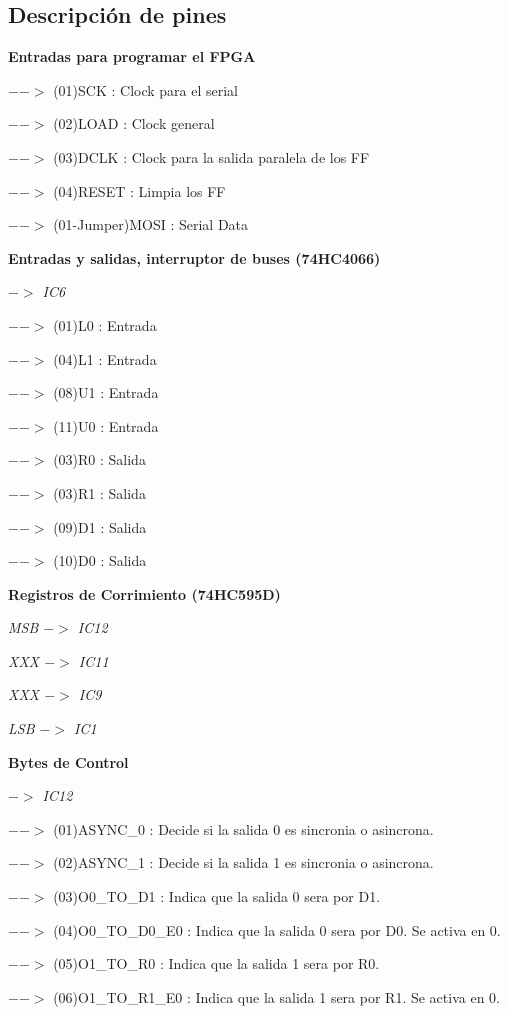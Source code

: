 \documentclass[12pt]{article}
\begin{document}
\pagebreak

\subsection{Descripción de pines}

\textbf{Entradas para programar el FPGA}

	$-->$	(01)SCK	:	Clock para el serial
	
	$-->$	(02)LOAD	:	Clock general
	
	$-->$	(03)DCLK	:	Clock para la salida paralela de los FF
	
	$-->$	(04)RESET	:	Limpia los FF
	
	$-->$	(01-Jumper)MOSI	:	Serial Data
	
\textbf{Entradas y salidas, interruptor de buses (74HC4066)}

\textit{$->$	IC6}

	$-->$	(01)L0	:	Entrada
	
	$-->$	(04)L1	:	Entrada
	
	$-->$	(08)U1	:	Entrada
	
	$-->$	(11)U0	:	Entrada
	
	$-->$	(03)R0	:	Salida
	
	$-->$	(03)R1	:	Salida
	
	$-->$	(09)D1	:	Salida
	
	$-->$	(10)D0	:	Salida
	
\textbf{Registros de Corrimiento	(74HC595D)}

\textit{MSB	$->$	IC12}

\textit{XXX	$->$	IC11}
	
\textit{XXX	$->$	IC9}
	
\textit{LSB	$->$	IC1}

\textbf{Bytes de Control}

\textit{$->$	IC12}

	$-->$	(01)ASYNC\_0	:	Decide si la salida 0 es sincronia o asincrona.
	
	$-->$	(02)ASYNC\_1	:	Decide si la salida 1 es sincronia o asincrona.
	
	$-->$	(03)O0\_TO\_D1	:	Indica que la salida 0 sera por D1.
	
	$-->$	(04)O0\_TO\_D0\_E0	:	Indica que la salida 0 sera por D0. Se activa en 0.
	
	$-->$	(05)O1\_TO\_R0	:	Indica que la salida 1 sera por R0.
	
	$-->$	(06)O1\_TO\_R1\_E0	:	Indica que la salida 1 sera por R1. Se activa en 0.
	
\end{document}
